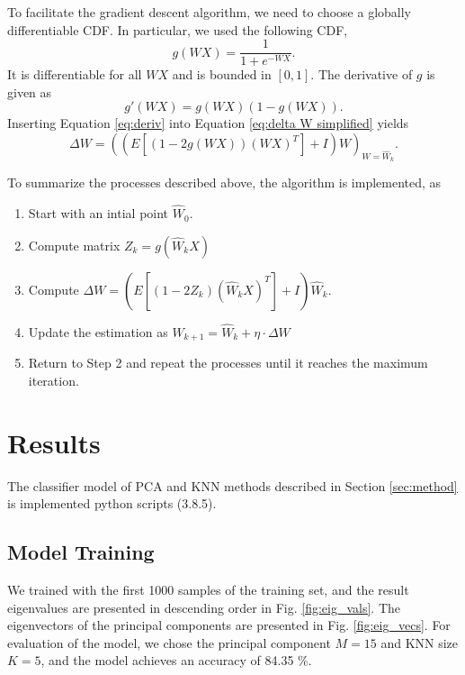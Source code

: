 \documentclass[conference]{IEEEtran}
\begin{document}
To facilitate the gradient descent algorithm, we need to choose a globally differentiable CDF. In particular, we used the following CDF,
\begin{equation}
    g(WX) = \frac{1}{1+e^{-WX}}.
\end{equation}
It is differentiable for all $WX$ and is bounded in $\left[0,1 \right]$. The derivative of $g$ is given as
\begin{equation}
\label{eq:deriv}
    g'(WX) = g(WX)(1-g(WX)).
\end{equation}
Inserting Equation \ref{eq:deriv} into Equation \ref{eq:delta W simplified} yields
\begin{equation}
    \Delta W = \left(\left(E\left[(1-2g(WX))(WX)^T\right] + I \right)W\right)_{W=\hat{W}_k}.
\end{equation}

To summarize the processes described above, the algorithm is implemented, as
\begin{enumerate}
    \item Start with an intial point $\hat{W}_0$.  
    \item Compute matrix $Z_k = g(\hat{W}_kX)$
    \item Compute $\Delta W = \left(E\left[(1-2Z_k)(\hat{W}_kX)^T\right] + I \right)\hat{W}_k$.
    \item Update the estimation as $\hat{W}_{k+1} = \hat{W}_k + \eta\cdot\Delta W$
    \item Return to Step 2 and repeat the processes until it reaches the maximum iteration.
\end{enumerate}


\section{Results} %

The classifier model of PCA and KNN methods described in Section \ref{sec:method} is implemented python scripts (3.8.5).

\subsection{Model Training}
We trained with the first 1000 samples of the training set, and the result eigenvalues are presented in descending order in Fig. \ref{fig:eig_vals}.
The eigenvectors of the principal components are presented in Fig. \ref{fig:eig_vecs}.
For evaluation of the model, we chose the principal component $M=15$ and KNN size $K=5$, and the model achieves an accuracy of 84.35 \%.
\end{document}
